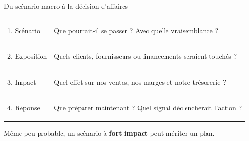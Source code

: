 \documentclass[aspectratio=169]{beamer}
\begin{document}
\begin{frame}{Du scénario macro à la décision d'affaires}
   \vfill
   \small
   \begin{tabularx}{\textwidth}{@{}>{\bfseries\raggedright\arraybackslash}p{}J@{}}
      \textcolor{HECnavy}{1. Scénario} & Que pourrait-il se passer ? Avec quelle vraisemblance ? \\[0.45cm]
      \textcolor{HECnavy}{2. Exposition} & Quels clients, fournisseurs ou financements seraient touchés ? \\[0.45cm]
      \textcolor{HECnavy}{3. Impact} & Quel effet sur nos ventes, nos marges et notre trésorerie ? \\[0.45cm]
      \textcolor{HECnavy}{4. Réponse} & Que préparer maintenant ? Quel signal déclencherait l'action ?
   \end{tabularx}
   \vspace{0.35cm}
   \begin{keyinsight}
      \RaggedRight\small Même peu probable, un scénario à \textbf{fort impact} peut mériter un plan.
   \end{keyinsight}
   \vfill
\end{frame}
\end{document}
